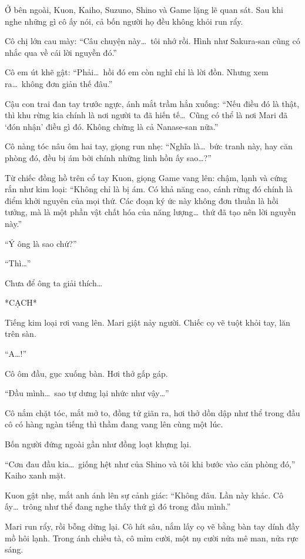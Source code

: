 \documentclass[../main.tex]{subfiles}
\begin{document}
Ở bên ngoài, Kuon, Kaiho, Suzuno, Shino và Game lặng lẽ quan sát. Sau khi nghe những gì cô ấy nói, cả bốn người họ đều không khỏi run rẩy.

Cô chị lớn cau mày: ``Câu chuyện này\dots\ tôi nhớ rồi. Hình như Sakura-san cũng có nhắc qua về cái lời nguyền đó.''

Cô em út khẽ gật: ``Phải\dots\ hồi đó em còn nghĩ chỉ là lời đồn. Nhưng xem ra\dots\ không đơn giản thế đâu.''

Cậu con trai đan tay trước ngực, ánh mắt trầm hẳn xuống: ``Nếu điều đó là thật, thì khu rừng kia chính là nơi người ta đã hiến tế\dots\ Cũng có thể là nơi Mari đã `đón nhận' điều gì đó. Không chừng là cả Nanase-san nữa.''

Cô nàng tóc nâu ôm hai tay, giọng run nhẹ: ``Nghĩa là\dots\ bức tranh này, hay căn phòng đó, đều bị ám bởi chính những linh hồn ấy sao\dots?''

Từ chiếc đồng hồ trên cổ tay Kuon, giọng Game vang lên: chậm, lạnh và cứng rắn như kim loại: ``Không chỉ là bị ám. Có khả năng cao, cánh rừng đó chính là điểm khởi nguyên của mọi thứ. Các đoạn ký ức này không đơn thuần là hồi tưởng, mà là một phần vật chất hóa của năng lượng\dots\ thứ đã tạo nên lời nguyền này.''

``Ý ông là sao chứ?''

``Thì\dots''

Chưa để ông ta giải thích\dots

*CẠCH*

Tiếng kim loại rơi vang lên. Mari giật nảy người. Chiếc cọ vẽ tuột khỏi tay, lăn trên sàn.

``A\dots!''

Cô ôm đầu, gục xuống bàn. Hơi thở gấp gáp.

``Đầu mình\dots\ sao tự dưng lại nhức như vậy\dots''


Cô nắm chặt tóc, mắt mở to, đồng tử giãn ra, hơi thở dồn dập như thể trong đầu cô có hàng ngàn tiếng thì thầm đang vang lên cùng một lúc.

Bốn người đứng ngoài gần như đồng loạt khựng lại.

``Cơn đau đầu kia\dots\ giống hệt như của Shino và tôi khi bước vào căn phòng đó,'' Kaiho xanh mặt.

Kuon gật nhẹ, mắt anh ánh lên sự cảnh giác: ``Không đâu. Lần này khác. Cô ấy\dots\ trông như thể đang nghe thấy thứ gì đó trong đầu mình.''

Mari run rẩy, rồi bỗng dừng lại. Cô hít sâu, nắm lấy cọ vẽ bằng bàn tay dính đầy mồ hôi lạnh. Trong ánh chiều tà, cô mỉm cười, một nụ cười nửa mê man, nửa rực sáng.
\end{document}
